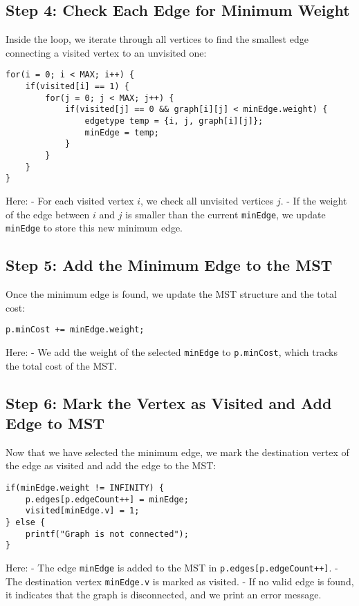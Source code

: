\documentclass{book}
\begin{document}
\subsection{Step 4: Check Each Edge for Minimum Weight}

Inside the loop, we iterate through all vertices to find the smallest edge connecting a visited vertex to an unvisited one:

\begin{verbatim}
for(i = 0; i < MAX; i++) {
    if(visited[i] == 1) {
        for(j = 0; j < MAX; j++) {
            if(visited[j] == 0 && graph[i][j] < minEdge.weight) {
                edgetype temp = {i, j, graph[i][j]};
                minEdge = temp;
            }
        }
    }
}
\end{verbatim}

Here:
- For each visited vertex \(i\), we check all unvisited vertices \(j\).
- If the weight of the edge between \(i\) and \(j\) is smaller than the current \texttt{minEdge}, we update \texttt{minEdge} to store this new minimum edge.

\subsection{Step 5: Add the Minimum Edge to the MST}

Once the minimum edge is found, we update the MST structure and the total cost:

\begin{verbatim}
p.minCost += minEdge.weight;
\end{verbatim}

Here:
- We add the weight of the selected \texttt{minEdge} to \texttt{p.minCost}, which tracks the total cost of the MST.

\subsection{Step 6: Mark the Vertex as Visited and Add Edge to MST}

Now that we have selected the minimum edge, we mark the destination vertex of the edge as visited and add the edge to the MST:

\begin{verbatim}
if(minEdge.weight != INFINITY) {
    p.edges[p.edgeCount++] = minEdge;
    visited[minEdge.v] = 1;
} else {
    printf("Graph is not connected");
}
\end{verbatim}

Here:
- The edge \texttt{minEdge} is added to the MST in \texttt{p.edges[p.edgeCount++]}.
- The destination vertex \texttt{minEdge.v} is marked as visited.
- If no valid edge is found, it indicates that the graph is disconnected, and we print an error message.
\end{document}
